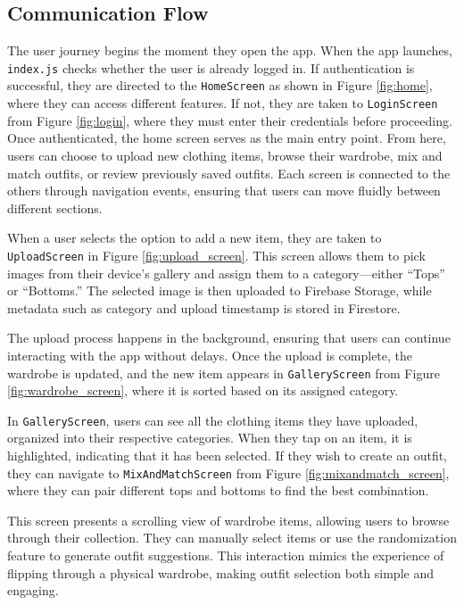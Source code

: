 \subsection{Communication Flow}
The user journey begins the moment they open the app. When the app launches, \texttt{index.js} checks whether the user is already logged in. If authentication is successful, they are directed to the \texttt{HomeScreen} as shown in Figure \ref{fig:home}, where they can access different features. If not, they are taken to \texttt{LoginScreen} from Figure \ref{fig:login}, where they must enter their credentials before proceeding.
Once authenticated, the home screen serves as the main entry point. From here, users can choose to upload new clothing items, browse their wardrobe, mix and match outfits, or review previously saved outfits. Each screen is connected to the others through navigation events, ensuring that users can move fluidly between different sections.

When a user selects the option to add a new item, they are taken to \texttt{UploadScreen} in Figure \ref{fig:upload_screen}. This screen allows them to pick images from their device’s gallery and assign them to a category—either “Tops” or “Bottoms.” The selected image is then uploaded to Firebase Storage, while metadata such as category and upload timestamp is stored in Firestore.

The upload process happens in the background, ensuring that users can continue interacting with the app without delays. Once the upload is complete, the wardrobe is updated, and the new item appears in \texttt{GalleryScreen} from Figure \ref{fig:wardrobe_screen}, where it is sorted based on its assigned category.


In \texttt{GalleryScreen}, users can see all the clothing items they have uploaded, organized into their respective categories. When they tap on an item, it is highlighted, indicating that it has been selected. If they wish to create an outfit, they can navigate to \texttt{MixAndMatchScreen} from Figure \ref{fig:mixandmatch_screen}, where they can pair different tops and bottoms to find the best combination.

This screen presents a scrolling view of wardrobe items, allowing users to browse through their collection. They can manually select items or use the randomization feature to generate outfit suggestions. This interaction mimics the experience of flipping through a physical wardrobe, making outfit selection both simple and engaging.

